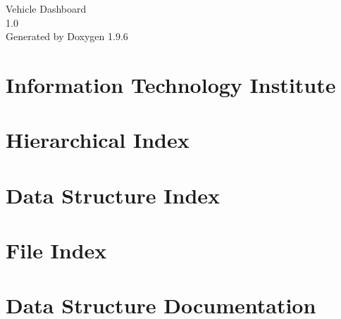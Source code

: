 \documentclass[twoside]{book}
\newcommand{\+}{\discretionary{\mbox{\scriptsize$\hookleftarrow$}}{}{}}
\newcommand{\clearemptydoublepage}{%
    \newpage{\pagestyle{empty}\cleardoublepage}%
  }
\begin{document}
  \raggedbottom
  \begin{titlepage}
  \vspace*{7cm}
  \begin{center}%
  {\Large Vehicle Dashboard}\\
  [1ex]\large 1.\+0 \\
  \vspace*{1cm}
  {\large Generated by Doxygen 1.9.6}\\
  \end{center}
  \end{titlepage}
  \clearemptydoublepage
  \tableofcontents
  \clearemptydoublepage
\chapter{Information Technology Institute}
\label{index}
\chapter{Hierarchical Index}

\chapter{Data Structure Index}

\chapter{File Index}

\chapter{Data Structure Documentation}













\end{document}
